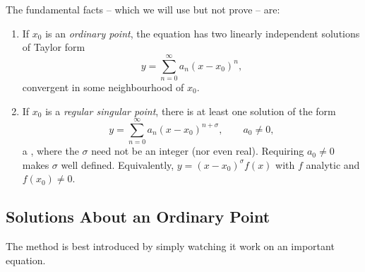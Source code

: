 The fundamental facts -- which we will use but not prove -- are:
\begin{enumerate}[label=(\arabic*)]
	\item If $x_0$ is an \emph{ordinary point}, the equation has two linearly independent solutions of Taylor form
	$$
	y = \sum_{n = 0}^{\infty} a_n (x - x_0)^n,
	$$
	convergent in some neighbourhood of $x_0$.
	\item If $x_0$ is a \emph{regular singular point}, there is at least one solution of the form
	$$
	y = \sum_{n = 0}^{\infty} a_n (x - x_0)^{n + \sigma}, \qquad a_0 \neq 0,
	$$
	a , where the  $\sigma$ need not be an integer (nor even real). Requiring $a_0 \neq 0$ makes $\sigma$ well defined. Equivalently, $y = (x - x_0)^\sigma f(x)$ with $f$ analytic and $f(x_0) \neq 0$.
\end{enumerate}

\subsection{Solutions About an Ordinary Point}

The method is best introduced by simply watching it work on an important equation.

